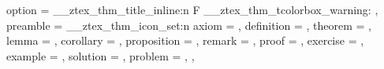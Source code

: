 {{    option = {
      \__ztex_thm_title_inline:n {F}
      \__ztex_thm_tcolorbox_warning:
    },
    preamble = {
      \zthmtitleformat*{\bfseries
        \zthmname\ \zthmnumber
        \zthmnotemptyTF{}{\\}
        \zthmnote{}{}
      }
      \newcommand{\ztex@llapnote}[1]{
        \mbox{}\llap{
        \adjustbox{set~height=0pt, set~depth=0pt}{
          \parbox[t]{2.85cm}{\raggedleft #1}}\hspace*{.75em}}
      }
      \__ztex_thm_icon_set:n 
        {
          axiom       = ,
          definition  = , 
          theorem     = , 
          lemma       = ,
          corollary   = , 
          proposition = , 
          remark      = ,
          proof       = , 
          exercise    = ,
          example     = ,
          solution    = , 
          problem     = ,
        }
    }
  },
}
